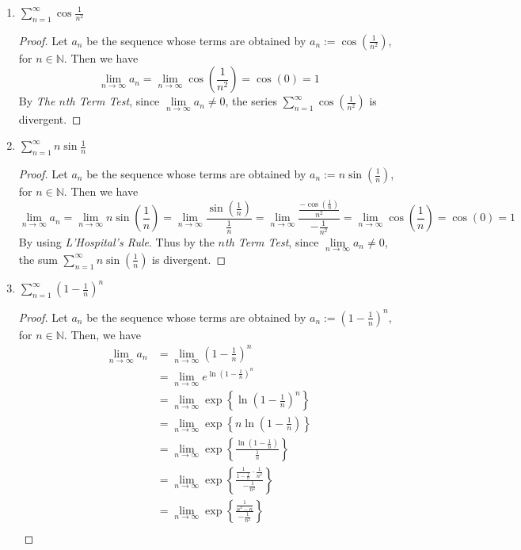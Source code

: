 \documentclass[12pt,letterpaper]{article}
\newcommand{\limx}[2]{\displaystyle\lim\limits_{#1 \to #2}}
\newcommand{\N}{\mathbb{N}}
\theoremstyle{case}
\theoremstyle{definition}
\begin{document}
\begin{enumerate}
\begin{enumerate}
			\item $\displaystyle\sum_{n=1}^{\infty} \cos \frac{1}{n^2}$
			\begin{proof}
				Let $a_n$ be the sequence whose terms are obtained by $a_n:= \cos \left(\frac{1}{n^2}\right)$, for $n \in \N$. Then we have 
				\[\limx{n}{\infty} a_n = \limx{n}{\infty} \cos \left(\frac{1}{n^2}\right) = \cos (0) = 1\]
				By \textit{The $n$th Term Test}, since $\limx{n}{\infty} a_n \neq 0$, the series $\displaystyle\sum_{n=1}^{\infty} \cos \left(\frac{1}{n^2}\right)$ is divergent.
			\end{proof}
		
			\item $\displaystyle\sum_{n=1}^{\infty} n \sin \frac{1}{n}$
			\begin{proof}
				Let $a_n$ be the sequence whose terms are obtained by $a_n:=n\sin\left(\frac{1}{n}\right)$, for $n \in \N$. Then we have
				\[\limx{n}{\infty} a_n = \limx{n}{\infty} n \sin \left(\frac{1}{n}\right)=\limx{n}{\infty} \frac{\sin\left(\frac{1}{n}\right)}{\frac{1}{n}}=\limx{n}{\infty} \frac{\frac{-\cos\left(\frac{1}{n}\right)}{n^2}}{-\frac{1}{n^2}}=\limx{n}{\infty} \cos\left(\frac{1}{n}\right) = \cos(0) = 1\]
				By using \textit{L'Hospital's Rule}. Thus by the \textit{$n$th Term Test}, since $\limx{n}{\infty} a_n \neq 0$, the sum $\displaystyle\sum_{n=1}^{\infty} n\sin\left(\frac{1}{n}\right)$ is divergent.
			\end{proof}
			\item $\displaystyle\sum_{n=1}^{\infty} \left(1-\frac{1}{n}\right)^n$
			\begin{proof}
				Let $a_n$ be the sequence whose terms are obtained by $a_n:=\left(1-\frac{1}{n}\right)^n$, for $n \in \N$. Then, we have
				\begin{align*}
					\limx{n}{\infty} a_n &= \limx{n}{\infty} \left(1-\frac{1}{n}\right)^n \\
					&= \limx{n}{\infty} e^{\ln \left(1-\frac{1}{n}\right)^n} \\
					&= \limx{n}{\infty} \exp\left\{\ln\left(1-\frac{1}{n}\right)^n\right\} \\
					&= \limx{n}{\infty} \exp \left\{n\ln\left(1-\frac{1}{n}\right)\right\} \\
					&= \limx{n}{\infty} \exp\left\{\frac{\ln\left(1-\frac{1}{n}\right)}{\frac{1}{n}}\right\} \\
					&= \limx{n}{\infty} \exp \left\{\frac{\frac{1}{1-\frac{1}{n}}\cdot \frac{1}{n^2}}{-\frac{1}{n^2}}\right\} \\
					&= \limx{n}{\infty} \exp \left\{\frac{\frac{1}{n^2-n}}{-\frac{1}{n^2}}\right\} \\

\end{align*}
\end{proof}
\end{enumerate}
\end{enumerate}
\end{document}
